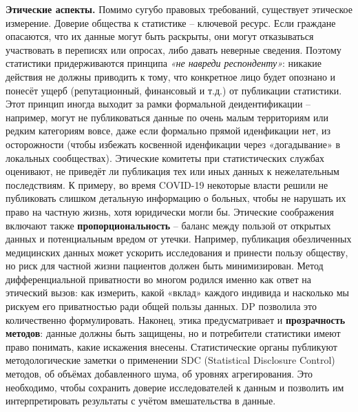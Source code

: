 \textbf{Этические аспекты.} Помимо сугубо правовых требований, существует этическое
измерение. Доверие общества к статистике – ключевой ресурс. Если граждане опасаются, что их данные могут быть раскрыты,
они могут отказываться участвовать в переписях или опросах, либо давать неверные сведения. Поэтому статистики
придерживаются принципа \textit{«не навреди респонденту»}: никакие действия не должны приводить к тому, что конкретное
лицо будет опознано и понесёт ущерб (репутационный, финансовый и т.д.) от публикации статистики. Этот принцип иногда
выходит за рамки формальной деидентификации – например, могут не публиковаться данные по очень малым территориям или
редким категориям вовсе, даже если формально прямой иденфикации нет, из осторожности (чтобы избежать косвенной
иденфикации через «догадывание» в локальных сообществах). Этические комитеты при статистических службах оценивают, не
приведёт ли публикация тех или иных данных к нежелательным последствиям. К примеру, во время COVID-19 некоторые власти
решили не публиковать слишком детальную информацию о больных, чтобы не нарушать их право на частную жизнь, хотя
юридически могли бы. Этические соображения включают также \textbf{пропорциональность} – баланс между пользой от открытых
данных и потенциальным вредом от утечки. Например, публикация обезличенных медицинских данных может ускорить
исследования и принести пользу обществу, но риск для частной жизни пациентов должен быть минимизирован. Метод
дифференциальной приватности во многом родился именно как ответ на этический вызов: как измерить, какой «вклад» каждого
индивида и насколько мы рискуем его приватностью ради общей пользы данных. DP позволила это количественно формулировать.
Наконец, этика предусматривает и \textbf{прозрачность методов}: данные должны быть защищены, но и потребители статистики
имеют право понимать, какие искажения внесены. Статистические органы публикуют методологические заметки о применении SDC
(Statistical Disclosure Control) методов, об объёмах добавленного шума, об уровнях агрегирования. Это необходимо, чтобы
сохранить доверие исследователей к данным и позволить им интерпретировать результаты с учётом вмешательства в данные.

